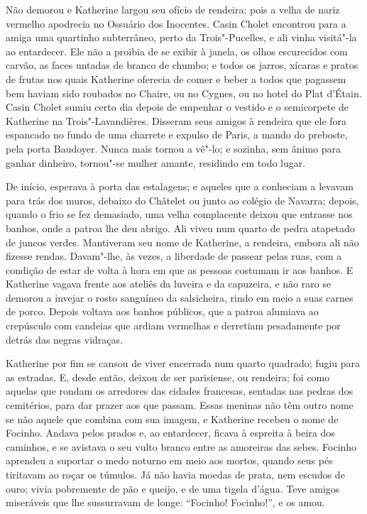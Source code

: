 Não demorou e Katherine largou seu ofício de rendeira: pois a velha de
nariz vermelho apodrecia no Ossuário dos Inocentes. Casin Cholet encontrou
para a amiga uma quartinho subterrâneo, perto da Trois"-Pucelles, e ali
vinha visitá"-la ao entardecer. Ele não a proibia de se exibir à janela, os
olhos escurecidos com carvão, as faces untadas de branco de chumbo; e
todos os jarros, xícaras e pratos de frutas nos quais Katherine oferecia
de comer e beber a todos que pagassem bem haviam sido roubados no Chaire,
ou no Cygnes, ou no hotel do Plat d’Étain. Casin Cholet sumiu certo dia
depois de empenhar o vestido e o semicorpete de Katherine na
Trois"-Lavandières. Disseram seus amigos à rendeira que ele fora espancado
no fundo de uma charrete e expulso de Paris, a mando do preboste, pela
porta Baudoyer. Nunca mais tornou a vê"-lo; e sozinha, sem ânimo para
ganhar dinheiro, tornou"-se mulher amante, residindo em todo lugar.

De início, esperava à porta das estalagens; e aqueles que a conheciam a
levavam para trás dos muros, debaixo do Châtelet ou junto ao colégio de
Navarra; depois, quando o frio se fez demasiado, uma velha complacente
deixou que entrasse nos banhos, onde a patroa lhe deu abrigo. Ali viveu
num quarto de pedra atapetado de juncos verdes. Mantiveram seu nome de
Katherine, a rendeira, embora ali não fizesse rendas. Davam"-lhe, às vezes,
a liberdade de passear pelas ruas, com a condição de estar de volta à hora
em que as pessoas costumam ir aos banhos. E Katherine vagava frente aos
ateliês da luveira e da capuzeira, e não raro se demorou a invejar o rosto
sanguíneo da salsicheira, rindo em meio a suas carnes de porco. Depois
voltava aos banhos públicos, que a patroa alumiava ao crepúsculo com
candeias que ardiam vermelhas e derretiam pesadamente por detrás das
negras vidraças.

Katherine por fim se cansou de viver encerrada num quarto quadrado; fugiu
para as estradas. E, desde então, deixou de ser parisiense, ou rendeira;
foi como aquelas que rondam os arredores das cidades francesas, sentadas
nas pedras dos cemitérios, para dar prazer aos que passam. Essas meninas
não têm outro nome se não aquele que combina com sua imagem, e Katherine
recebeu o nome de Focinho. Andava pelos prados e, ao entardecer, ficava à
espreita à beira dos caminhos, e se avistava o seu vulto branco entre as
amoreiras das sebes. Focinho aprendeu a suportar o medo noturno em meio
aos mortos, quando seus pés tiritavam ao roçar os túmulos. Já não havia
moedas de prata, nem escudos de ouro; vivia pobremente de pão e queijo, e
de uma tigela d’água. Teve amigos miseráveis que lhe sussurravam de longe:
“Focinho! Focinho!”, e os amou.

